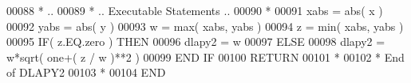 \begin{DoxyCode}
00088 \textcolor{comment}{*     ..}
00089 \textcolor{comment}{*     .. Executable Statements ..}
00090 \textcolor{comment}{*}
00091       xabs = abs( x )
00092       yabs = abs( y )
00093       w = max( xabs, yabs )
00094       z = min( xabs, yabs )
00095       \textcolor{keywordflow}{IF}( z.EQ.zero ) \textcolor{keywordflow}{THEN}
00096          dlapy2 = w
00097       \textcolor{keywordflow}{ELSE}
00098          dlapy2 = w*sqrt( one+( z / w )**2 )
00099 \textcolor{keywordflow}{      END IF}
00100       \textcolor{keywordflow}{RETURN}
00101 \textcolor{comment}{*}
00102 \textcolor{comment}{*     End of DLAPY2}
00103 \textcolor{comment}{*}
00104 \textcolor{keyword}{      END}
\end{DoxyCode}
